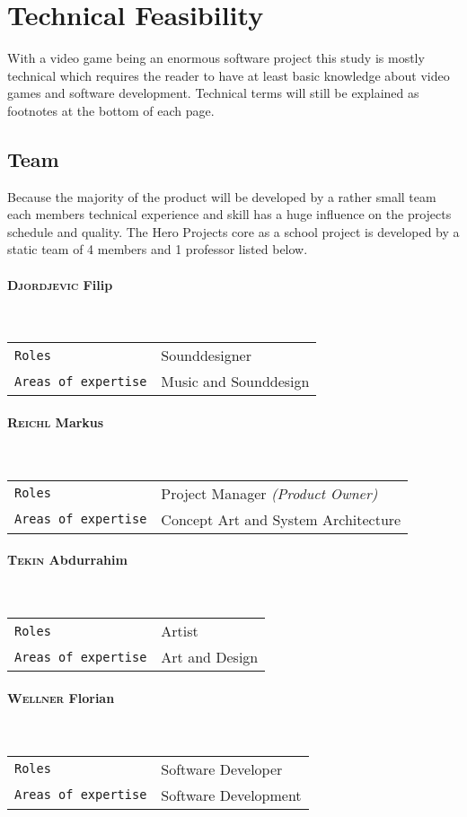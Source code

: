 \documentclass[11pt]{article}
\begin{document}
\newpage

\section{Technical Feasibility}
With a video game being an enormous software project this study is mostly technical which requires the reader to have at least basic knowledge about video games and software development.
Technical terms will still be explained as footnotes at the bottom of each page.

\subsection{Team}
Because the majority of the product will be developed by a rather small team each members technical experience and skill has a huge influence on the projects schedule and quality.
The Hero Projects core as a school project is developed by a static team of 4 members and 1 professor listed below.
\paragraph{\textsc{Djordjevic} Filip} ~\\
\begin{tabular}{ll}
\texttt{Roles} & Sounddesigner\\
\texttt{Areas of expertise} & Music and Sounddesign
\end{tabular}
\paragraph{\textsc{Reichl} Markus} ~\\
\begin{tabular}{ll}
\texttt{Roles} & Project Manager \textit{\small{(Product Owner)}}\\
\texttt{Areas of expertise} & Concept Art and System Architecture
\end{tabular}
\paragraph{\textsc{Tekin} Abdurrahim} ~\\
\begin{tabular}{ll}
\texttt{Roles} & Artist\\
\texttt{Areas of expertise} & Art and Design
\end{tabular}
\paragraph{\textsc{Wellner} Florian} ~\\
\begin{tabular}{ll}
\texttt{Roles} & Software Developer\\
\texttt{Areas of expertise} & Software Development
\end{tabular}
\end{document}
